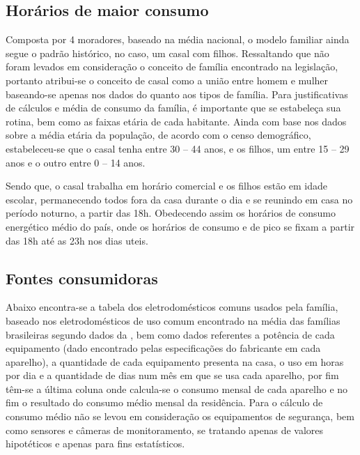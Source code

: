 \subsection{Horários de maior consumo}

	Composta por 4 moradores, baseado na média nacional, o modelo familiar ainda segue o padrão histórico, no caso, um casal com filhos. Ressaltando que não foram levados em consideração o conceito de família encontrado na legislação, portanto atribui-se o conceito de casal como a união entre homem e mulher baseando-se apenas nos dados do \cite{IBGE} quanto aos tipos de família. Para justificativas de cálculos e média de consumo da família, é importante que se estabeleça sua rotina, bem como as faixas etária de cada habitante. Ainda com base nos dados sobre a média etária da população, de acordo com o censo demográfico, estabeleceu-se que o casal tenha entre 30 – 44 anos, e os filhos, um entre 15 – 29 anos e o outro entre 0 – 14 anos.

	Sendo que, o casal trabalha em horário comercial e os filhos estão em idade escolar, permanecendo todos fora da casa durante o dia e se reunindo em casa no período noturno, a partir das 18h. Obedecendo assim os horários de consumo energético médio do país, onde os horários de consumo e de pico se fixam a partir das 18\si{\hour} até as 23\si{\hour} nos dias uteis.

\subsection{Fontes consumidoras}

	Abaixo encontra-se a tabela dos eletrodomésticos comuns usados pela família, baseado nos eletrodomésticos de uso comum encontrado na média das famílias brasileiras segundo dados da \cite{2013Aneel}, bem como dados referentes a potência de cada equipamento (dado encontrado pelas especificações do fabricante em cada aparelho), a quantidade de cada equipamento presenta na casa, o uso em horas por dia e a quantidade de dias num mês em que se usa cada aparelho, por fim têm-se a última coluna onde calcula-se o consumo mensal de cada aparelho e no fim o resultado do consumo médio mensal da residência. Para o cálculo de consumo médio não se levou em consideração os equipamentos de segurança, bem como sensores e câmeras de monitoramento, se tratando apenas de valores hipotéticos e apenas para fins estatísticos.

